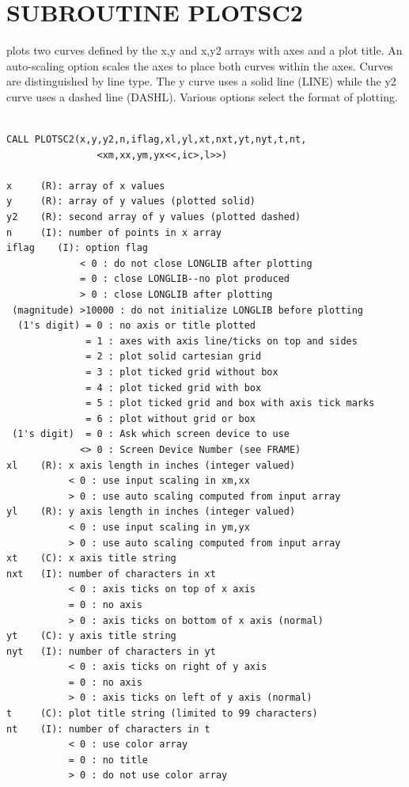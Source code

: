 \documentclass[11pt]{report}
\begin{document}
\newpage
\section{SUBROUTINE PLOTSC2}

 plots two curves defined by the x,y and x,y2 arrays with
axes and a plot title.  An auto-scaling option scales the axes to
place both curves within the axes.  Curves are distinguished by line
type.  The y curve uses a solid line (LINE) while the y2 curve uses a dashed
line (DASHL).  Various options select the format of plotting.
\begin{verbatim}

CALL PLOTSC2(x,y,y2,n,iflag,xl,yl,xt,nxt,yt,nyt,t,nt,
                <xm,xx,ym,yx<<,ic>,l>>)

x     (R): array of x values
y     (R): array of y values (plotted solid)
y2    (R): second array of y values (plotted dashed)
n     (I): number of points in x array
iflag    (I): option flag
             < 0 : do not close LONGLIB after plotting
             = 0 : close LONGLIB--no plot produced
             > 0 : close LONGLIB after plotting
 (magnitude) >10000 : do not initialize LONGLIB before plotting
  (1's digit) = 0 : no axis or title plotted
              = 1 : axes with axis line/ticks on top and sides
              = 2 : plot solid cartesian grid
              = 3 : plot ticked grid without box
              = 4 : plot ticked grid with box
              = 5 : plot ticked grid and box with axis tick marks
              = 6 : plot without grid or box
 (1's digit)  = 0 : Ask which screen device to use
             <> 0 : Screen Device Number (see FRAME)
xl    (R): x axis length in inches (integer valued)
           < 0 : use input scaling in xm,xx
           > 0 : use auto scaling computed from input array
yl    (R): y axis length in inches (integer valued)
           < 0 : use input scaling in ym,yx
           > 0 : use auto scaling computed from input array
xt    (C): x axis title string
nxt   (I): number of characters in xt
           < 0 : axis ticks on top of x axis
           = 0 : no axis
           > 0 : axis ticks on bottom of x axis (normal)
yt    (C): y axis title string
nyt   (I): number of characters in yt
           < 0 : axis ticks on right of y axis
           = 0 : no axis
           > 0 : axis ticks on left of y axis (normal)
t     (C): plot title string (limited to 99 characters)
nt    (I): number of characters in t
           < 0 : use color array 
           = 0 : no title
           > 0 : do not use color array

\end{verbatim}
\end{document}
